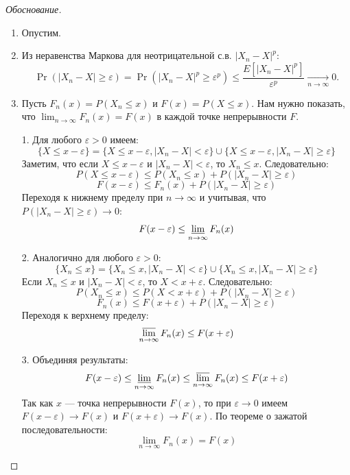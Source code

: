 \documentclass[10pt]{article}
\begin{document}
\begin{proof}[Обоснование]\;
\begin{enumerate}
    \item Опустим.
    \item Из неравенства Маркова для неотрицательной с.в. $|X_n-X|^p$:
    \[
    \Pr(|X_n-X| \ge \varepsilon) = \Pr(|X_n-X|^p \ge \varepsilon^p) \le \frac{E[|X_n-X|^p]}{\varepsilon^p} \xrightarrow[n\to\infty]{} 0.
    \]
    \item Пусть $F_n(x) = P(X_n \le x)$ и $F(x) = P(X \le x)$. Нам нужно показать, что $\lim_{n \to \infty} F_n(x) = F(x)$ в каждой точке непрерывности $F$.

1. Для любого $\varepsilon > 0$ имеем:
\[ \{X \le x - \varepsilon\} = \{X \le x - \varepsilon, |X_n - X| < \varepsilon\} \cup \{X \le x - \varepsilon, |X_n - X| \ge \varepsilon\} \]
Заметим, что если $X \le x - \varepsilon$ и $|X_n - X| < \varepsilon$, то $X_n \le x$. Следовательно:
\[ P(X \le x - \varepsilon) \le P(X_n \le x) + P(|X_n - X| \ge \varepsilon) \]
\[ F(x - \varepsilon) \le F_n(x) + P(|X_n - X| \ge \varepsilon) \]
Переходя к нижнему пределу при $n \to \infty$ и учитывая, что $P(|X_n - X| \ge \varepsilon) \to 0$:
\[ F(x - \varepsilon) \le \varliminf_{n \to \infty} F_n(x) \]

2. Аналогично для любого $\varepsilon > 0$:
\[ \{X_n \le x\} = \{X_n \le x, |X_n - X| < \varepsilon\} \cup \{X_n \le x, |X_n - X| \ge \varepsilon\} \]
Если $X_n \le x$ и $|X_n - X| < \varepsilon$, то $X < x + \varepsilon$. Следовательно:
\[ P(X_n \le x) \le P(X < x + \varepsilon) + P(|X_n - X| \ge \varepsilon) \]
\[ F_n(x) \le F(x + \varepsilon) + P(|X_n - X| \ge \varepsilon) \]
Переходя к верхнему пределу:
\[ \varlimsup_{n \to \infty} F_n(x) \le F(x + \varepsilon) \]

3. Объединяя результаты:
\[ F(x - \varepsilon) \le \varliminf_{n \to \infty} F_n(x) \le \varlimsup_{n \to \infty} F_n(x) \le F(x + \varepsilon) \]
Так как $x$ --- точка непрерывности $F(x)$, то при $\varepsilon \to 0$ имеем $F(x-\varepsilon) \to F(x)$ и $F(x+\varepsilon) \to F(x)$. По теореме о зажатой последовательности:
\[ \lim_{n \to \infty} F_n(x) = F(x) \]

\end{enumerate}
\end{proof}
\end{document}
